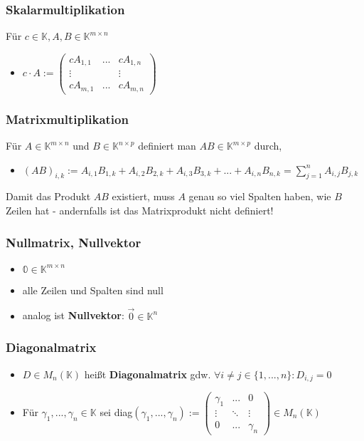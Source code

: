 \documentclass[titlepage]{article}
\newcommand{\K}{\mathbb{K}}
\newcommand{\1}{\mathbb{1}}
\newcommand{\0}{\mathbb{0}}
\begin{document}
				\subsubsection{Skalarmultiplikation}
					Für $c\in\K,A,B\in\K^{m\times n}$
					\begin{itemize}
						\item $c\cdot A:=\begin{pmatrix}
							cA_{1,1}&...&cA_{1,n}\\
							\vdots&&\vdots\\
							cA_{m,1}&...&cA_{m,n}
						\end{pmatrix}$
					\end{itemize}
				\subsubsection{Matrixmultiplikation}
					Für $A\in\K^{m\times n}$ und $B\in\K^{n\times p}$ definiert man $AB\in\K^{m\times p}$ durch,
					\begin{itemize}
						\item $(AB)_{i,k}:=A_{i,1}B_{1,k}+A_{i,2}B_{2,k}+A_{i,3}B_{3,k}+...+A_{i,n}B_{n,k}=\sum\limits^n_{j=1}A_{i,j}B_{j,k}$
					\end{itemize}
					Damit das Produkt $AB$ existiert, muss $A$ genau so viel Spalten haben, wie $B$ Zeilen hat - andernfalls ist das Matrixprodukt nicht definiert!
				\subsubsection{Nullmatrix, Nullvektor}
					\begin{itemize}
						\item $\mathbb{0}\in\K^{m\times n}$
						\item alle Zeilen und Spalten sind null
						\item analog ist \textbf{Nullvektor}: $\vec{0}\in\K^n$
					\end{itemize}
				\subsubsection{Diagonalmatrix}
					\begin{itemize}
						\item $D\in M_n(\K)$ heißt \textbf{Diagonalmatrix} gdw. $\forall i\neq j\in\{1,...,n\}:D_{i,j}=0$
						\item Für $\gamma_1,...,\gamma_n\in\K$ sei diag$(\gamma_1,...,\gamma_n):=\begin{pmatrix}
							\gamma_1&...&0\\
							\vdots&\ddots&\vdots\\
							0&...&\gamma_n
						\end{pmatrix}\in M_n(\K)$
					\end{itemize}
\end{document}
